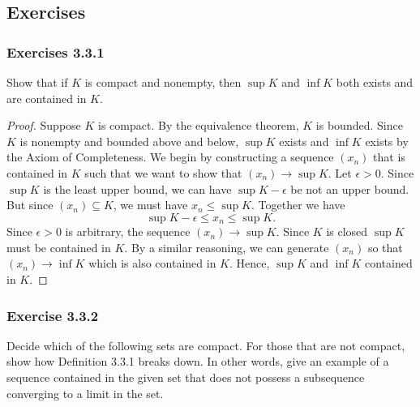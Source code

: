 \subsection{Exercises}

\subsubsection{Exercises 3.3.1} Show that if \( K \) is compact and nonempty, then \( \sup K  \) and \( \inf K \) both exists and are contained in \( K \).
\begin{proof}
   Suppose \( K \) is compact. By the equivalence theorem, \( K \) is bounded. Since \( K \) is nonempty and bounded above and below, \( \sup K  \) exists and \( \inf K \) exists by the Axiom of Completeness. We begin by constructing a sequence \( (x_n) \) that is contained in \( K \) such that we want to show that \( (x_n) \to \sup K \). Let \( \epsilon > 0  \). Since \( \sup K \) is the least upper bound, we can have \( \sup K - \epsilon   \) be not an upper bound. But since \( (x_n) \subseteq K \), we must have \( x_n \leq \sup K \). Together we have 
\[ \sup K - \epsilon \leq x_n \leq \sup K. \]
Since \( \epsilon > 0  \) is arbitrary, the sequence \( (x_n) \to \sup K \). Since \( K  \) is closed \( \sup K \) must be contained in \( K \). By a similar reasoning, we can generate \( (x_n) \)
so that \( (x_n) \to \inf K \) which is also contained in \( K \). Hence, \( \sup K  \) and \( \inf K \) contained in \( K \).
\end{proof}

\subsubsection{Exercise 3.3.2} Decide which of the following sets are compact. For those that are not compact, show how Definition 3.3.1 breaks down. In other words, give an example of a sequence contained in the given set that does not possess a subsequence converging to a limit in the set.

